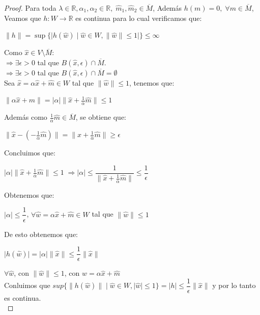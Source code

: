 \documentclass[12pt,a4paper]{book}
\providecommand{\abs}[1]{\lvert#1\rvert}
\providecommand{\norm}[1]{\lVert#1\rVert}
\providecommand{\conj}[1]{\lbrace#1\rbrace}
\begin{document}
\begin{proof}
Para toda $\lambda\in\mathbb{R},\alpha_{1},\alpha_{2}\in\mathbb{R},\;\widehat{m}_{1},\widehat{m}_{2}\in\overline{M}$, Además $h(m)=0,\;\forall m\in\overline{M}$, Veamos que $h:W\rightarrow\mathbb{R}$ es continua para lo cual verificamos que:
\begin{center}
$\norm{h}=\sup\conj{\abs{h(\widehat{w})\;|\; \widehat{w}\in W, \norm{\widehat{w}}\leq 1}}\leq\infty$
\end{center}
Como $\widehat{x}\in V\setminus\overline{M}$:\\

$\Rightarrow\exists\epsilon >0$ tal que $B(\widehat{x},\epsilon)\cap\overline{M}$.\\
$\Rightarrow\exists\epsilon >0$ tal que $B(\widehat{x},\epsilon)\cap\overline{M}=\emptyset$\\

Sea $\widehat{x}=\alpha\widehat{x}+\widehat{m}\in W$ tal que $\norm{\widehat{w}}\leq 1$, tenemos que:
\begin{center}
 $\norm{\alpha\widehat{x}+\widehat{m}}=\abs{\alpha}\norm{\widehat{x}+\frac{1}{\alpha}\widehat{m}}\leq 1$
\end{center}
Además como $\frac{1}{\alpha}\widehat{m}\in\overline{M}$, se obtiene que:
\begin{center}
 $\norm{\widehat{x}-(-\frac{1}{\alpha}\widehat{m})}=\norm{\widehat{x}+\frac{1}{\alpha}\widehat{m}}\geq\epsilon$
\end{center}
Concluimos que:
\begin{center}
$\abs{\alpha}\norm{\widehat{x}+\frac{1}{\alpha}\widehat{m}}\leq 1\; \Rightarrow \abs{\alpha}\leq \dfrac{1}{\norm{\widehat{x}+\frac{1}{\alpha}\widehat{m}}}\leq\dfrac{1}{\epsilon}$
\end{center}
Obtenemos que:
\begin{center}
$\abs{\alpha}\leq\dfrac{1}{\epsilon}$, $\forall\widehat{w}=\alpha\widehat{x}+\widehat{m}\in W$ tal que $\norm{\widehat{w}}\leq 1$
\end{center} 
De esto obtenemos que:
\begin{center}
$\abs{h(\widehat{w})}=\abs{\alpha}\norm{\widehat{x}}\leq\dfrac{1}{\epsilon}\norm{\widehat{x}}$
\end{center}
$\forall \widehat{w}$, con $\norm{\widehat{w}}\leq 1$, con $w=\alpha\widehat{x}+\widehat{m}$\\

Conluimos que $sup\conj{\norm{h(\widehat{w})}\;|\; \widehat{w}\in W, \abs{\widehat{w}}\leq 1}=\abs{h}\leq\dfrac{1}{\epsilon}\norm{\widehat{x}}$ y por lo tanto es continua.\\


\end{proof}
\end{document}
